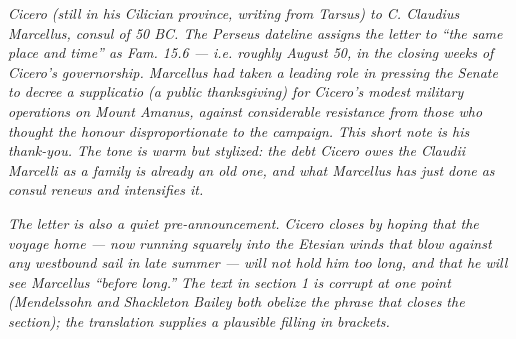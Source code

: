 
\textit{Cicero (still in his Cilician province, writing from Tarsus) to
C. Claudius Marcellus, consul of 50 BC. The Perseus dateline assigns the
letter to ``the same place and time'' as \textit{Fam.} 15.6 ---
i.e. roughly August 50, in the closing weeks of Cicero's governorship.
Marcellus had taken a leading role in pressing the Senate to decree
a \textit{supplicatio} (a public thanksgiving) for Cicero's modest
military operations on Mount Amanus, against considerable resistance
from those who thought the honour disproportionate to the campaign.
This short note is his thank-you. The tone is warm but stylized: the
debt Cicero owes the Claudii Marcelli as a family is already an old
one, and what Marcellus has just done as consul renews and intensifies
it.}

\textit{The letter is also a quiet pre-announcement. Cicero closes by
hoping that the voyage home --- now running squarely into the Etesian
winds that blow against any westbound sail in late summer --- will not
hold him too long, and that he will see Marcellus ``before long.''
The text in section 1 is corrupt at one point (Mendelssohn and
Shackleton Bailey both obelize the phrase that closes the section);
the translation supplies a plausible filling in brackets.}
